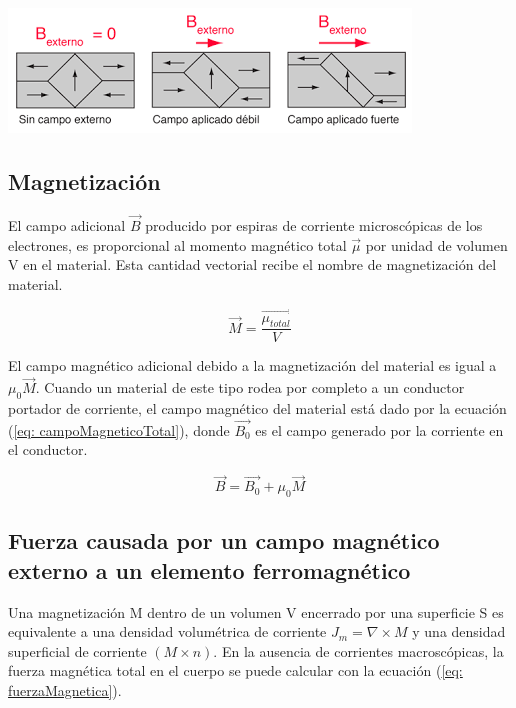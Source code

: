 \documentclass[a4paper,12pt]{article}
\newenvironment{Figure}
    {\par\medskip\noindent\minipage{\linewidth}}
    {\endminipage\par\medskip}
\begin{document}
        \begin{Figure}
            \centering
            \includegraphics[width=0.6\linewidth]{ferromagnetismo_campoMagneticoAplicado.png}
            \label{fig: ferromagnetismo_campoMagneticoAplicado}
        \end{Figure}

    \subsection*{Magnetización}

        El campo adicional $\vec{B}$ producido por espiras de corriente microscópicas de los electrones, es proporcional al momento magnético total $\vec{\mu}$ por unidad de volumen V en el material. Esta cantidad vectorial recibe el nombre de magnetización del material.

        \begin{equation}
            \label{eq: magnetizacion}
            \vec{M} = \frac{\vec{\mu_{total}}}{V}
        \end{equation}

        El campo magnético adicional debido a la magnetización del material es igual a $\mu_0 \vec{M}$. Cuando un material de este tipo rodea por completo a un conductor portador de corriente, el campo magnético del material está dado por la ecuación (\ref{eq: campoMagneticoTotal}), donde $\vec{B_0}$ es el campo generado por la corriente en el conductor.

        \begin{equation}
            \label{eq: campoMagneticoTotal}
            \vec{B} = \vec{B_0} + \mu_0 \vec{M}
        \end{equation}

    \subsection*{Fuerza causada por un campo magnético externo a un elemento ferromagnético}

        Una magnetización M dentro de un volumen V encerrado por una superficie S es equivalente a una densidad volumétrica de corriente $J_m = \nabla \times M$ y una densidad superficial de corriente $(M \times n)$. En la ausencia de corrientes macroscópicas, la fuerza magnética total en el cuerpo se puede calcular con la ecuación (\ref{eq: fuerzaMagnetica}).
\end{document}
